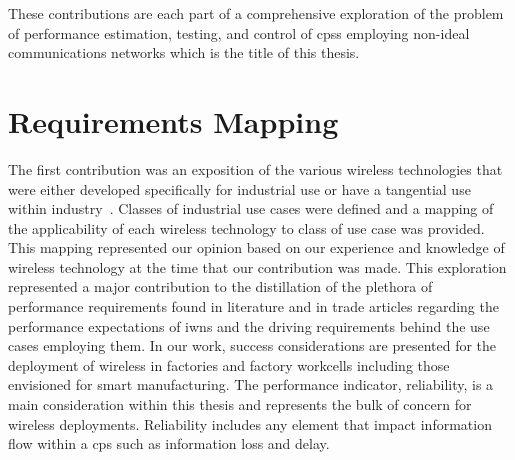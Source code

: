 These contributions are each part of a comprehensive exploration of the problem of performance estimation, testing, and control of \glspl{cps} employing non-ideal communications networks which is the title of this thesis.  

\section{Requirements Mapping}

The first contribution was an exposition of the various wireless technologies that were either developed specifically for industrial use or have a tangential use within industry~\cite{CandellRW2017}.  Classes of industrial use cases were defined and a mapping of the applicability of each wireless technology to class of use case was provided.  This mapping represented our opinion based on our experience and knowledge of wireless technology at the time that our contribution was made.  This exploration represented a major contribution to the distillation of the plethora of performance requirements found in literature and in trade articles regarding the performance expectations of \glspl{iwn} and the driving requirements behind the use cases employing them.  In our work, success considerations are presented for the deployment of wireless in factories and factory workcells including those envisioned for smart manufacturing.  The performance indicator, reliability, is a main consideration within this thesis and represents the bulk of  concern for wireless deployments.  Reliability includes any element that impact information flow within a \gls{cps} such as information loss and delay.  

